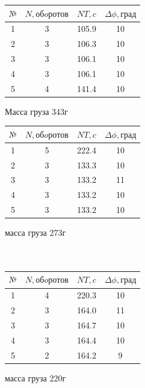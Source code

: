 \documentclass{article}
\begin{document}
\begin{center}
\begin{minipage}{0.4\textwidth}
\begin{tabular}{|c|c|c|c|}
\hline
 $№$ & $N, обoротов$ & $NT, c$ & $\Delta \phi, град$ \\
\hline 
 1 & 3 & 105.9 &  10\\
\hline
 2 & 3 & 106.3 & 10\\
\hline 
 3 & 3 & 106.1 &  10\\
\hline
 4 & 3 & 106.1 & 10\\
\hline
 5 & 4 & 141.4 & 10\\
\hline
\end{tabular}
\begin{center}
\caption{Масса груза 343г}
\end{center}
\end{minipage}
\begin{minipage}{0.4\textwidth}
\begin{tabular}{|c|c|c|c|}
\hline
 $№$ & $N, обoротов$ & $NT, c$ & $\Delta \phi, град$ \\
\hline 
 1 & 5 & 222.4 & 10\\
\hline
 2 & 3 & 133.3 & 10\\
\hline 
 3 & 3 & 133.2 & 11\\
\hline
 4 & 3 & 133.2 & 10\\
\hline
 5 & 3 & 133.2 & 10\\
\hline
\end{tabular}
\begin{center}
\caption{масса груза 273г}
\end{center}
\end{minipage}
\\
\begin{align*}
\end{align*}
\begin{minipage}{0.4\textwidth}
\begin{tabular}{|c|c|c|c|}
\hline
 $№$ & $N, обoротов$ & $NT, c$ & $\Delta \phi, град$ \\
\hline 
 1 & 4 & 220.3 &  10\\
\hline
 2 & 3 & 164.0 & 11 \\
\hline 
 3 & 3 & 164.7 &  10\\
\hline
 4 & 3 & 164.4 & 10\\
\hline
 5 & 2 & 164.2 & 9\\
\hline
\end{tabular}
\begin{center}
\caption{масса груза 220г}

\end{center}
\end{minipage}
\end{center}
\end{document}
